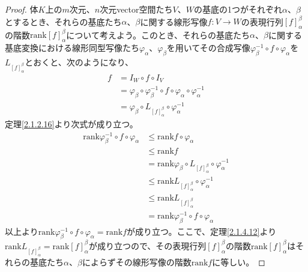 \documentclass[dvipdfmx]{jsarticle}
\begin{document}
\begin{proof}
体$K$上の$m$次元、$n$次元vector空間たち$V$、$W$の基底の1つがそれぞれ$\alpha$、$\beta$とするとき、それらの基底たち$\alpha$、$\beta$に関する線形写像$f:V \rightarrow W$の表現行列$[ f]^{\beta}_{\alpha}$の階数${\mathrm{rank}}[ f]^{\beta}_{\alpha}$について考えよう。このとき、それらの基底たち$\alpha$、$\beta$に関する基底変換における線形同型写像たち$\varphi_{\alpha}$、$\varphi_{\beta}$を用いてその合成写像$\varphi_{\beta}^{- 1} \circ f \circ \varphi_{\alpha}$を$L_{[ f]^{\beta}_{\alpha}}$とおくと、次のようになり、
\begin{align*}
f &= I_{W} \circ f \circ I_{V}\\
&= \varphi_{\beta} \circ \varphi_{\beta}^{- 1} \circ f \circ \varphi_{\alpha} \circ \varphi_{\alpha}^{- 1}\\
&= \varphi_{\beta} \circ L_{[ f]^{\beta}_{\alpha}} \circ \varphi_{\alpha}^{- 1}
\end{align*}
定理\ref{2.1.2.16}より次式が成り立つ。
\begin{align*}
{\mathrm{rank}}{\varphi_{\beta}^{- 1} \circ f \circ \varphi_{\alpha}} &\leq {\mathrm{rank}}{f \circ \varphi_{\alpha}}\\
&\leq {\mathrm{rank}}f\\
&= {\mathrm{rank}}{\varphi_{\beta} \circ L_{[ f]^{\beta}_{\alpha}} \circ \varphi_{\alpha}^{- 1}}\\
&\leq {\mathrm{rank}}{L_{[ f]^{\beta}_{\alpha}} \circ \varphi_{\alpha}^{- 1}}\\
&\leq {\mathrm{rank}}L_{[ f]^{\beta}_{\alpha}}\\
&= {\mathrm{rank}}{\varphi_{\beta}^{- 1} \circ f \circ \varphi_{\alpha}}
\end{align*}
以上より${\mathrm{rank}}{\varphi_{\beta}^{- 1} \circ f \circ \varphi_{\alpha}} = {\mathrm{rank}}f$が成り立つ。ここで、定理\ref{2.1.4.12}より${\mathrm{rank}}L_{[ f]^{\beta}_{\alpha}} = {\mathrm{rank}}[ f]^{\beta}_{\alpha}$が成り立つので、その表現行列$[ f]^{\beta}_{\alpha}$の階数${\mathrm{rank}}[ f]^{\beta}_{\alpha}$はそれらの基底たち$\alpha$、$\beta$によらずその線形写像の階数${\mathrm{rank}}f$に等しい。
\end{proof}
\end{document}
